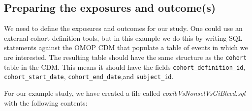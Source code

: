 \documentclass[]{article}
\begin{document}
\hypertarget{preparing-the-exposures-and-outcomes}{%
\subsection{Preparing the exposures and
outcome(s)}\label{preparing-the-exposures-and-outcomes}}

We need to define the exposures and outcomes for our study. One could
use an external cohort definition tools, but in this example we do this
by writing SQL statements against the OMOP CDM that populate a table of
events in which we are interested. The resulting table should have the
same structure as the \texttt{cohort} table in the CDM. This means it
should have the fields \texttt{cohort\_definition\_id},
\texttt{cohort\_start\_date}, \texttt{cohort\_end\_date},and
\texttt{subject\_id}.

For our example study, we have created a file called
\emph{coxibVsNonselVsGiBleed.sql} with the following contents:
\end{document}
